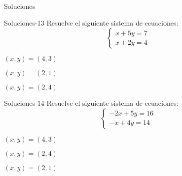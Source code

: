 \documentclass[a4,11pt]{aleph-notas}
\begin{document}
\begin{quiz}{Soluciones}
\begin{multi}[]%
    {Soluciones-13}
    Resuelve el siguiente sistema de ecuaciones:
    \[
    \begin{cases}
    x + 5y = 7 \\
    x + 2y = 4
    \end{cases}
    \]
    \item $(x, y) = (4, 3)$
    \item* $(x, y) = (2, 1)$
    \item $(x, y) = (2, 4)$
\end{multi}

\begin{multi}[]%
    {Soluciones-14}
    Resuelve el siguiente sistema de ecuaciones:
    \[
    \begin{cases}
    -2x + 5y = 16 \\
    -x + 4y = 14
    \end{cases}
    \]
    \item $(x, y) = (4, 3)$
    \item* $(x, y) = (2, 4)$
    \item $(x, y) = (2, 1)$
\end{multi}

\end{quiz}
\end{document}
